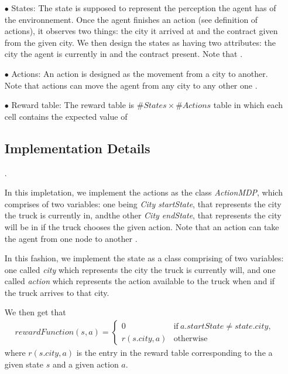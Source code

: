 \documentclass[11pt]{article}
\begin{document}
 	\begin{itemize}
 		 \item[$\bullet$] States: The state is supposed to represent the perception the agent has of the environnement. Once the agent finishes an action (see definition of actions), it observes two things: the city it arrived at and the contract given from the given city. We then design the states as having two attributes: the city the agent is currently in and the contract present. Note that .
 		 
 		 \item[$\bullet$] Actions: An action is designed as the movement from a city to another. Note that actions can move the agent from any city to any other one .
 		 
 		 \item[$\bullet$] Reward table: The reward table is $\# States\times\# Actions$ table in which each cell contains the expected value of 
 		 
\subsection{Implementation Details}.

In this impletation, we implement the actions as the class \emph{ActionMDP}, which comprises of two variables: one being \emph{City startState}, that represents the city the truck is currently in, andthe other \emph{City endState}, that represents the city will be in if the truck chooses the given action. Note that an action can take the agent from one node to another . 

 In this fashion, we implement the state as a class comprising of two variables: one called \emph{city} which represents the city the truck is currently will, and one called \emph{action} which represents the action available to the truck when and if the truck arrives to that city.
 
 We then get that 
 			\begin{align*}
 				rewardFunction(s,a)= 
 					\begin{cases}
 						0 & \mathrm{if}\ a.startState\neq state.city,\\
 						r(s.city,a) & \mathrm{otherwise}
					\end{cases}
			\end{align*}
where $r(s.city,a)$ is the entry in the reward table corresponding to the a given state $s$ and a given action $a$.
 

\end{itemize}
\end{document}
